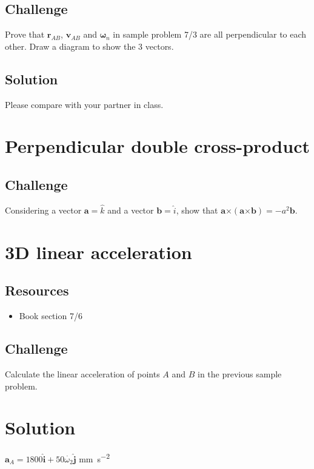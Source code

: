 \subsection*{Challenge}
Prove that $\bm{r}_{AB}$, $\bm{v}_{AB}$ and $\bm{\omega}_n$ in sample problem 7/3 are all perpendicular to each other. Draw a diagram to show the 3 vectors.

\subsection*{Solution}
Please compare with your partner in class.




\newpage
\section{Perpendicular double cross-product}

\subsection*{Challenge}
Considering a vector $\bm{a} = \hat{k}$ and a vector $\bm{b} = \hat{i}$, show that $\bm{a} \bm{\times} (\bm{a} \bm{\times} \bm{b}) = -a^2 \bm{b}$.




\newpage
\section{3D linear acceleration}

\subsection*{Resources}
\begin{itemize}
    \item Book section 7/6
\end{itemize}

\subsection*{Challenge}
Calculate the linear acceleration of points $A$ and $B$ in the previous sample problem.

\section*{Solution}
$\bm{a}_A = 1800 \bm{\hat{i}} + 50 \dot{\omega_2} \bm{\hat{j}}$ \si{\mm\per\square\second}


